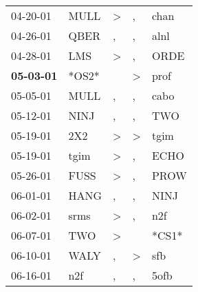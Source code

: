 \begin{supertabular}{p{0.07\textwidth}p{0.06\textwidth}p{0.02\textwidth}p{0.02\textwidth}p{0.06\textwidth}}
          04-20-01\textsuperscript{} &           MULL\textsuperscript{} &     \textgreater &                , &           chan\textsuperscript{} \\
          04-26-01\textsuperscript{} &           QBER\textsuperscript{} &                , &                , &           alnl\textsuperscript{} \\
          04-28-01\textsuperscript{} &            LMS\textsuperscript{} &     \textgreater &                , &           ORDE\textsuperscript{} \\
 \textbf{05-03-01\textsuperscript{}} &                            *OS2* &                  &     \textgreater &           prof\textsuperscript{} \\
          05-05-01\textsuperscript{} &           MULL\textsuperscript{} &                , &                , &           cabo\textsuperscript{} \\
          05-12-01\textsuperscript{} &           NINJ\textsuperscript{} &                , &                , &            TWO\textsuperscript{} \\
          05-19-01\textsuperscript{} &            2X2\textsuperscript{} &     \textgreater &     \textgreater &           tgim\textsuperscript{} \\
          05-19-01\textsuperscript{} &           tgim\textsuperscript{} &     \textgreater &                , &           ECHO\textsuperscript{} \\
          05-26-01\textsuperscript{} &           FUSS\textsuperscript{} &     \textgreater &                , &           PROW\textsuperscript{} \\
          06-01-01\textsuperscript{} &           HANG\textsuperscript{} &                , &                , &           NINJ\textsuperscript{} \\
          06-02-01\textsuperscript{} &           srms\textsuperscript{} &     \textgreater &                , &            n2f\textsuperscript{} \\
          06-07-01\textsuperscript{} &            TWO\textsuperscript{} &     \textgreater &                  &                            *CS1* \\
          06-10-01\textsuperscript{} &           WALY\textsuperscript{} &                , &     \textgreater &            sfb\textsuperscript{} \\
          06-16-01\textsuperscript{} &            n2f\textsuperscript{} &                , &                , &           5ofb\textsuperscript{} \\

\end{supertabular}
